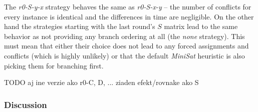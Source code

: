 The \emph{r0-S-y-x} strategy behaves the same as \emph{r0-S-x-y} -- the number of conflicts for every instance is identical and the differences in time are negligible.
On the other hand the strategies starting with the last round's $S$ matrix lead to the same behavior as not providing any branch ordering at all (the \emph{none} strategy).
This must mean that either their choice does not lead to any forced assignments and conflicts (which is highly unlikely) or that the default \emph{MiniSat} heuristic is also picking them for branching first.

TODO aj ine verzie ako r0-C, D, ... ziaden efekt/rovnake ako S

\subsubsection{Discussion}

